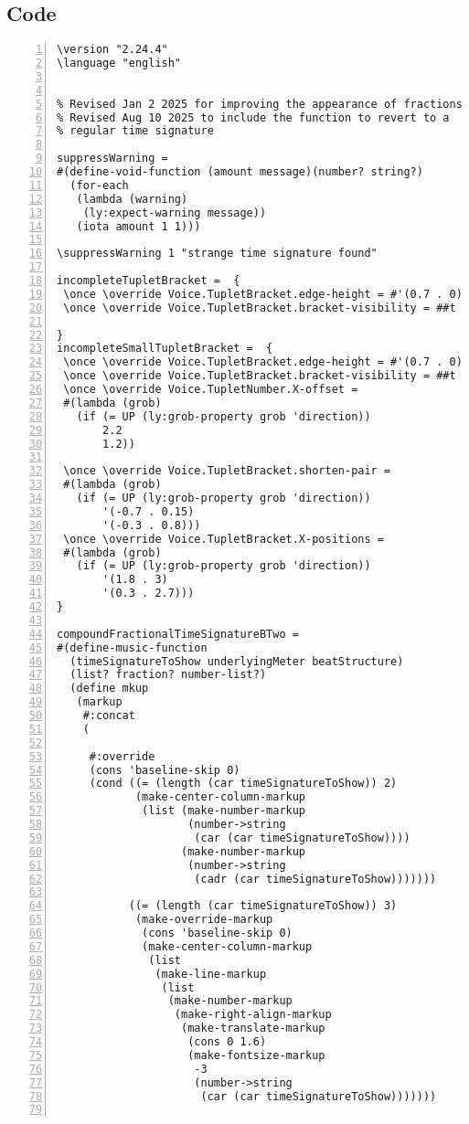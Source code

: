 \subsection{Code}
\begin{Verbatim}[numbers=left,xleftmargin=5mm]
\version "2.24.4"
\language "english"


% Revised Jan 2 2025 for improving the appearance of fractions
% Revised Aug 10 2025 to include the function to revert to a
% regular time signature

suppressWarning =
#(define-void-function (amount message)(number? string?)
  (for-each
   (lambda (warning)
    (ly:expect-warning message))
   (iota amount 1 1)))

\suppressWarning 1 "strange time signature found"

incompleteTupletBracket =  {
 \once \override Voice.TupletBracket.edge-height = #'(0.7 . 0)
 \once \override Voice.TupletBracket.bracket-visibility = ##t

}
incompleteSmallTupletBracket =  {
 \once \override Voice.TupletBracket.edge-height = #'(0.7 . 0)
 \once \override Voice.TupletBracket.bracket-visibility = ##t
 \once \override Voice.TupletNumber.X-offset =
 #(lambda (grob)
   (if (= UP (ly:grob-property grob 'direction))
       2.2
       1.2))

 \once \override Voice.TupletBracket.shorten-pair =
 #(lambda (grob)
   (if (= UP (ly:grob-property grob 'direction))
       '(-0.7 . 0.15)
       '(-0.3 . 0.8)))
 \once \override Voice.TupletBracket.X-positions =
 #(lambda (grob)
   (if (= UP (ly:grob-property grob 'direction))
       '(1.8 . 3)
       '(0.3 . 2.7)))
}

compoundFractionalTimeSignatureBTwo =
#(define-music-function
  (timeSignatureToShow underlyingMeter beatStructure)
  (list? fraction? number-list?)
  (define mkup
   (markup
    #:concat
    (

     #:override
     (cons 'baseline-skip 0)
     (cond ((= (length (car timeSignatureToShow)) 2)
            (make-center-column-markup
             (list (make-number-markup
                    (number->string
                     (car (car timeSignatureToShow))))
                   (make-number-markup
                    (number->string
                     (cadr (car timeSignatureToShow)))))))

           ((= (length (car timeSignatureToShow)) 3)
            (make-override-markup
             (cons 'baseline-skip 0)
             (make-center-column-markup
              (list
               (make-line-markup
                (list
                 (make-number-markup
                  (make-right-align-markup
                   (make-translate-markup
                    (cons 0 1.6)
                    (make-fontsize-markup
                     -3
                     (number->string
                      (car (car timeSignatureToShow)))))))


\end{Verbatim}
